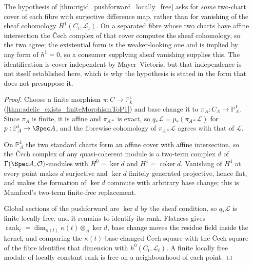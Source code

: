 \begin{remark}
  \label{rem:fiber_h1_vanishing_form}
  The hypothesis of \cref{thm:rigid_pushforward_locally_free} asks for
  \emph{some} two-chart cover of each fibre with surjective difference map,
  rather than for vanishing of the sheaf cohomology \(H^1(C_t, \mathcal{L}_t)\).
  On a separated fibre whose two charts have affine intersection the {\v C}ech
  complex of that cover computes the sheaf cohomology, so the two agree; the
  existential form is the weaker-looking one and is implied by any form of
  \(h^1 = 0\), so a consumer supplying sheaf vanishing supplies this. The
  identification is cover-independent by Mayer--Vietoris, but that
  independence is not itself established here, which is why the hypothesis is
  stated in the form that does not presuppose it.
\end{remark}

\begin{proof}\leanok
  Choose a finite morphism \(\pi : C \to \mathbb{P}^1_k\)
  (\cref{thm:adelic_exists_finiteMorphismToP1}) and base change it to
  \(\pi_A : C_A \to \mathbb{P}^1_A\). Since \(\pi_A\) is finite, it is affine and
  \(\pi_{A*}\) is exact, so \(q_* \mathcal{L} = p_* (\pi_{A*} \mathcal{L})\) for
  \(p : \mathbb{P}^1_A \to \Spec A\), and the fibrewise cohomology of
  \(\pi_{A*}\mathcal{L}\) agrees with that of \(\mathcal{L}\).

  On \(\mathbb{P}^1_A\) the two standard charts form an affine cover with affine
  intersection, so the {\v C}ech complex of any quasi-coherent module is a
  two-term complex \(d\) of \(\Gamma(\Spec A, \mathcal{O})\)-modules with
  \(H^0 = \ker d\) and \(H^1 = \operatorname{coker} d\). Vanishing of \(H^1\) at
  every point makes \(d\) surjective and \(\ker d\) finitely generated
  projective, hence flat, and makes the formation of \(\ker d\) commute with
  arbitrary base change; this is Mumford's two-term finite-free replacement.

  Global sections of the pushforward are \(\ker d\) by the sheaf condition, so
  \(q_* \mathcal{L}\) is finite locally free, and it remains to identify its
  rank. Flatness gives
  \(\operatorname{rank}_t = \dim_{\kappa(t)} \kappa(t) \otimes_A \ker d\), base
  change moves the residue field inside the kernel, and comparing the
  \(\kappa(t)\)-base-changed {\v C}ech square with the {\v C}ech square of the
  fibre identifies that dimension with \(h^0(C_t, \mathcal{L}_t)\). A finite
  locally free module of locally constant rank is free on a neighbourhood of each
  point.
\end{proof}

